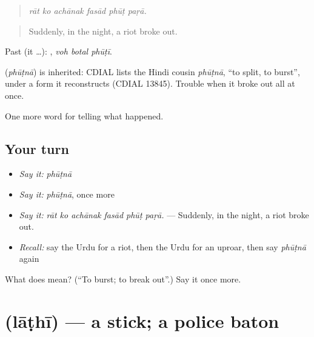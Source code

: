 \begin{quote}
     
\end{quote}

\begin{quote}
\emph{rāt ko achānak fasād phūṭ paṛā.}
\end{quote}

\begin{quote}
Suddenly, in the night, a riot broke out.
\end{quote}

Past (it …):   , \emph{voh botal phūṭī}.

\begin{cousinweb}
\textbf{} (\emph{phūṭnā}) is inherited: CDIAL lists the Hindi cousin \emph{phūṭnā}, \textquotedblleft{}to split, to burst\textquotedblright{}, under a form it reconstructs (CDIAL 13845). Trouble \textbf{ } when it broke out all at once.
\end{cousinweb}

\begin{grammarlens}[title={What you've built}]
One more word for telling what happened.
\end{grammarlens}

\subsection*{Your turn}
\begin{itemize}
\raggedright
  \item \emph{Say it:} \emph{phūṭnā}
  \item \emph{Say it:} \emph{phūṭnā}, once more
  \item \emph{Say it:} \emph{rāt ko achānak fasād phūṭ paṛā.} — Suddenly, in the night, a riot broke out.
  \item \emph{Recall:} say the Urdu for a riot, then the Urdu for an uproar, then say \emph{phūṭnā} again
\end{itemize}

\begin{tcolorbox}[breakable,colback=teal!4,colframe=teal!35!black,title={Before you move on}]
What does  mean? (\textquotedblleft{}To burst; to break out\textquotedblright{}.) Say it once more.
\end{tcolorbox}
\section[\texorpdfstring{\ur{لاٹھی} (lāṭhī)}{لاٹھی (lāṭhī)}]{ (lāṭhī) — a stick; a police baton}

